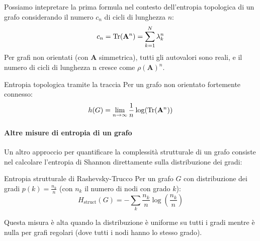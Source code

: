 Possiamo intepretare la prima formula nel contesto dell'entropia topologica di un grafo considerando il numero $c_n$ di cicli di lunghezza $n$:
\begin{equation}
    c_n=\Tr(\mathbf{A}^n)=\sum_{k=1}^{N}\lambda_k^n 
\end{equation} 
Per grafi non orientati (con $\mathbf{A}$ simmetrica), tutti gli autovalori sono reali, e il numero di cicli di lunghezza n cresce come $\rho(\mathbf{A})^n$.
\begin{boxl}{Entropia topologica tramite la traccia}
Per un grafo non orientato fortemente connesso:
\begin{equation}
    h(G)=\lim_{n \to \infty}\frac{1}{n}\log(\Tr(\mathbf{A}^n))
\end{equation}    
\end{boxl}

\paragraph{Altre misure di entropia di un grafo}
Un altro approccio per quantificare la complessità strutturale di un grafo consiste nel calcolare l'entropia di Shannon direttamente sulla distribuzione dei gradi:
\begin{boxb}{Entropia strutturale di Rashevsky-Trucco}
    Per un grafo $G$ con distribuzione dei gradi $p(k)=\frac{n_k}{n}$ (con $n_k$ il numero di nodi con grado $k$):
    \begin{equation}
        H_{\text{struct}}(G)=-\sum_{k}^{}\frac{n_k}{n}\log(\frac{n_k}{n})
    \end{equation}
\end{boxb}
Questa misura è alta quando la distribuzione è uniforme su tutti i gradi mentre è nulla per grafi regolari (dove tutti i nodi hanno lo stesso grado).\\

